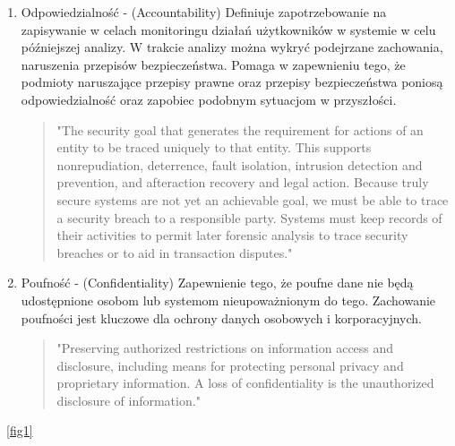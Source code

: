 \documentclass[runningheads,12pt]{llncs}
\begin{document}
\begin{enumerate}
    \item Odpowiedzialność - (Accountability) Definiuje zapotrzebowanie na zapisywanie w celach monitoringu działań użytkowników w systemie w celu późniejszej analizy. W trakcie analizy można wykryć podejrzane zachowania, naruszenia przepisów bezpieczeństwa. Pomaga w zapewnieniu tego, że podmioty naruszające przepisy prawne oraz przepisy bezpieczeństwa poniosą odpowiedzialność oraz zapobiec podobnym sytuacjom w przyszłości.
    \begin{quote}
        "The security goal that generates the requirement for actions of an entity to be traced uniquely to that entity. This supports nonrepudiation, deterrence, fault isolation, intrusion detection and prevention, and afteraction recovery and legal action. Because truly secure systems are not yet an achievable goal, we must be able to trace a security breach to a responsible party. Systems must keep records of their activities to permit later forensic analysis to trace security breaches or to aid in transaction disputes." ~\cite[p. 23]{stallings2017cryptography}
    \end{quote}
    \item Poufność - (Confidentiality) Zapewnienie tego, że poufne dane nie będą udostępnione osobom lub systemom nieupoważnionym do tego. Zachowanie poufności jest kluczowe dla ochrony danych osobowych i korporacyjnych.
    \begin{quote}
        "Preserving authorized restrictions on information access and disclosure, including means for protecting personal privacy and proprietary information. A loss of confidentiality is the unauthorized disclosure of information." ~\cite[p. 22]{stallings2017cryptography}
    \end{quote}
\end{enumerate}

~\ref{fig1}
\end{document}
